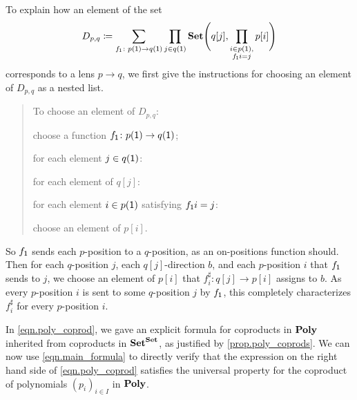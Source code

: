 \documentclass[Book-Poly]{subfiles}
\begin{document}
\begin{exercise}
\begin{solution}
\begin{longenum}
\item To explain how an element of the set
\[
	D_{p,q} \coloneqq \sum_{f_{\textsf{1}}\colon p(\textsf{1})\to q(\textsf{1})}\prod_{j\in q(\textsf{1})}\mathbf{Set}\Bigg(q[j],\prod_{\substack{i \in p(\textsf{1}), \\ f_{\textsf{1}}i = j}}p[i]\Bigg)
\]
corresponds to a lens $p\to q$, we first give the instructions for choosing an element of $D_{p,q}$ as a nested list.
\begin{quote}
To choose an element of $D_{p,q}$:
\begin{longenum}
    \item choose a function $f_{\textsf{1}} \colon p(\textsf{1}) \to q(\textsf{1})$;
    \item for each element $j \in q(\textsf{1})$:
    \begin{longenum}
        \item for each element of $q[j]$:
        \begin{longenum}
            \item for each element $i \in p(\textsf{1})$ satisfying $f_{\textsf{1}}i = j$:
            \begin{longenum}
                \item choose an element of $p[i]$.
            \end{longenum}
        \end{longenum}
    \end{longenum}
\end{longenum}
\end{quote}
So $f_{\textsf{1}}$ sends each $p$-position to a $q$-position, as an on-positions function should.
Then for each $q$-position $j$, each $q[j]$-direction $b$, and each $p$-position $i$ that $f_{\textsf{1}}$ sends to $j$, we choose an element of $p[i]$ that $f^\sharp_i\colon q[j]\to p[i]$ assigns to $b$.
As every $p$-position $i$ is sent to some $q$-position $j$ by $f_{\textsf{1}}$, this completely characterizes $f^\sharp_i$ for every $p$-position $i$.
\end{longenum}
\end{solution}
\end{exercise}

In \eqref{eqn.poly_coprod}, we gave an explicit formula for coproducts in $\mathbf{Poly}$ inherited from coproducts in $\mathbf{Set}^{\mathbf{Set}}$, as justified by \cref{prop.poly_coprods}.
We can now use \eqref{eqn.main_formula} to directly verify that the expression on the right hand side of \eqref{eqn.poly_coprod} satisfies the universal property for the coproduct of polynomials $(p_i)_{i\in I}$ in $\mathbf{Poly}$.

\end{document}
